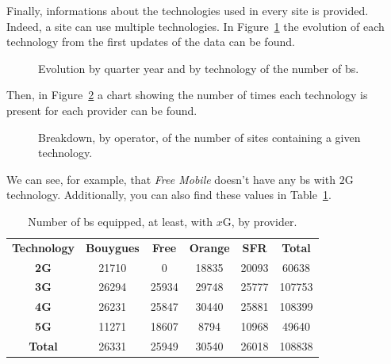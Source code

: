 \documentclass[lettersize,journal,english]{IEEEtran}
\begin{document}
        Finally, informations about the technologies used in every site is provided. Indeed, a site can use multiple technologies.
        In Figure~\ref{fig:data_evolution} the evolution of each technology from the first updates of the data can be found.
        \begin{figure}
            \centering
            \caption{Evolution by quarter year and by technology of the number of \acrshort{bs}.}
            \label{fig:data_evolution}
        \end{figure}
        Then, in Figure~\ref{fig:data_technos} a chart showing the number of times each technology is present for each provider can be found.
        \begin{figure}
            \centering
            \caption{Breakdown, by operator, of the number of sites containing a given technology.}
            \label{fig:data_technos}
        \end{figure}
        We can see, for example, that \emph{Free Mobile} doesn't have any \acrshort{bs} with $2$G technology. Additionally, you can also find these values in Table~\ref{table:techno_numbers}.
        \begin{table}
            \centering
            \caption{Number of \acrshort{bs} equipped, at least, with $x$G, by provider.}
            \label{table:techno_numbers}
            \begin{tabular}{cccccc}
                \toprule
                \textbf{Technology} & \textbf{Bouygues} & \textbf{Free} & \textbf{Orange} & \textbf{SFR} & \textbf{Total} \\
                \cmidrule(lr){1-6}
                \textbf{2G} & 21710 & 0 & 18835 & 20093 & 60638 \\
                \textbf{3G} & 26294 & 25934 & 29748 & 25777 & 107753 \\
                \textbf{4G} & 26231 & 25847 & 30440 & 25881 & 108399 \\
                \textbf{5G} & 11271 & 18607 & 8794 & 10968 & 49640 \\
                \textbf{Total} & 26331 & 25949 & 30540 & 26018 & 108838 \\
                \bottomrule
            \end{tabular}
        \end{table}
\end{document}
